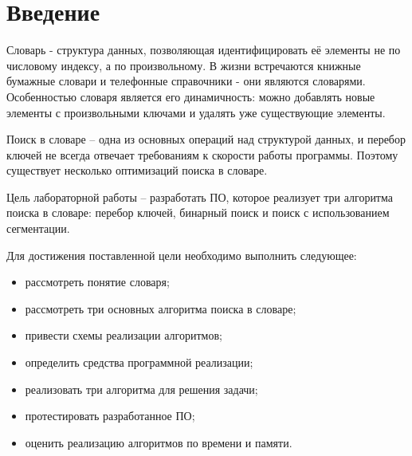 \newpage
{}

\chapter*{Введение}
Словарь - структура данных, позволяющая идентифицировать её элементы не по числовому индексу, а по произвольному.
В жизни встречаются книжные бумажные словари и телефонные справочники - они являются словарями.
Особенностью словаря является его динамичность: можно добавлять новые элементы с произвольными ключами и удалять уже существующие элементы.

Поиск в словаре -- одна из основных операций над структурой данных, и перебор ключей не всегда отвечает требованиям к скорости работы программы.
Поэтому существует несколько оптимизаций поиска в словаре.

Цель лабораторной работы -- разработать ПО, которое реализует три алгоритма поиска в словаре: перебор ключей, бинарный поиск и поиск с использованием сегментации.

Для достижения поставленной цели необходимо выполнить следующее:
\begin{itemize}
	\item рассмотреть понятие словаря;
	\item рассмотреть три основных алгоритма поиска в словаре;
	\item привести схемы реализации алгоритмов;
	\item определить средства программной реализации;
	\item реализовать три алгоритма для решения задачи;
	\item протестировать разработанное ПО;
	\item оценить реализацию алгоритмов по времени и памяти.
\end{itemize}